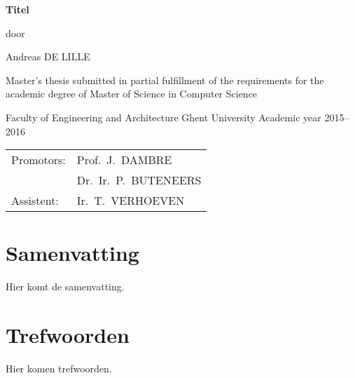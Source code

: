 
\newpage

{
\setlength{\baselineskip}{14pt}
\setlength{\parindent}{0pt}
\setlength{\parskip}{8pt}

\begin{center}

\noindent \textbf{\huge Titel}

door 

Andreas DE LILLE

\end{center}

Master’s thesis submitted in partial fulfillment of the requirements for the academic degree of
Master of Science in Computer Science

Faculty of Engineering and Architecture
Ghent University
Academic year 2015--2016

\begin{tabular}{ll}
Promotors: & Prof.~J.~DAMBRE\\
 & Dr.~Ir.~P.~BUTENEERS\\
Assistent: & Ir.~T.~VERHOEVEN\\
\end{tabular}

\section*{Samenvatting}


Hier komt de samenvatting.


\section*{Trefwoorden}


Hier komen trefwoorden.

}

\newpage %
